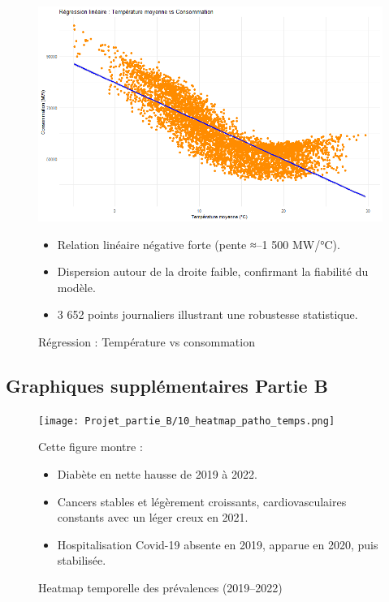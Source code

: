 \documentclass[12pt,a4paper]{article}
\begin{document}
\begin{figure}[H]
  \centering
  \begin{minipage}[t]{0.48\textwidth}
    \centering
    \includegraphics[width=\linewidth]{Projet_partie_A/regression_temp_vs_conso.png}
    \caption{Régression : Température vs consommation}
    \label{fig:regression_temp_conso}
  \end{minipage}
  \hfill
  \begin{minipage}[t]{0.48\textwidth}
    \small
    \begin{itemize}
      \item Relation linéaire négative forte (pente ≈–1 500 MW/°C).  
      \item Dispersion autour de la droite faible, confirmant la fiabilité du modèle.  
      \item 3 652 points journaliers illustrant une robustesse statistique.  
    \end{itemize}
  \end{minipage}
\end{figure}

\subsection{Graphiques supplémentaires Partie B}

\begin{figure}[H]
  \centering
  \begin{minipage}[t]{0.48\textwidth}
    \centering
    \texttt{[image: Projet\_partie\_B/10\_heatmap\_patho\_temps.png]}
    \caption{Heatmap temporelle des prévalences (2019–2022)}
    \label{fig:heatmap_temps}
  \end{minipage}
  \hfill
  \begin{minipage}[t]{0.48\textwidth}
    \small
    Cette figure montre :
    \begin{itemize}
      \item Diabète en nette hausse de 2019 à 2022.  
      \item Cancers stables et légèrement croissants, cardiovasculaires constants avec un léger creux en 2021.  
      \item Hospitalisation Covid-19 absente en 2019, apparue en 2020, puis stabilisée.  
    \end{itemize}
  \end{minipage}
\end{figure}
\end{document}

